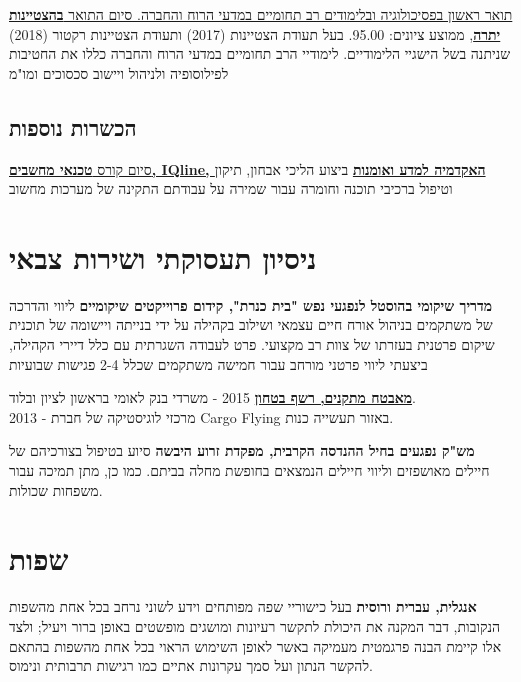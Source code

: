 {\href{https://www.dropbox.com/s/pcm0mybvgi85ma0/BA-Psych.pdf}{תואר ראשון בפסיכולוגיה ובלימודים רב תחומיים במדעי הרוח והחברה. סיום התואר \textbf{בהצטיינות יתרה}}, ממוצע ציונים: 95.00.}
{בעל תעודת הצטיינות (2017) ותעודת הצטיינות רקטור (2018) שניתנה בשל הישגיי הלימודיים.}
{לימודיי הרב תחומיים במדעי הרוח והחברה כללו את החטיבות לפילוסופיה ולניהול ויישוב סכסוכים ומו"מ}

\subsection{הכשרות נוספות}

{\href{https://www.dropbox.com/s/csphxdynjdg3ze2/computer-technitian-certificate.jpg?dl=0}{סיום קורס 
		\textbf{טכנאי מחשבים, IQline, האקדמיה למדע ואומנות}}}
{ביצוע הליכי אבחון, תיקון וטיפול ברכיבי תוכנה וחומרה עבור שמירה על עבודתם התקינה של מערכות מחשוב}
{}

\section{ניסיון תעסוקתי ושירות צבאי}

{\textbf{מדריך שיקומי בהוסטל לנפגעי נפש "בית כנרת", קידום פרוייקטים שיקומיים}}
{ליווי והדרכה של משתקמים בניהול אורח חיים עצמאי ושילוב בקהילה על ידי בנייתה ויישומה של תוכנית שיקום פרטנית בעזרתו של צוות רב מקצועי. פרט לעבודה השגרתית עם כלל דיירי הקהילה, ביצעתי ליווי פרטני מורחב עבור חמישה משתקמים שכלל 2-4 פגישות שבועיות}
{}

{\href{https://www.dropbox.com/s/kr5rcui1zgp35i0/recommendation-letter-security-guard.jpg?dl=0}{\textbf{מאבטח מתקנים, רשף בטחון}}} 
{2015 - משרדי בנק לאומי בראשון לציון ובלוד. 
	\\		
	2013 - מרכזי לוגיסטיקה של חברת Cargo Flying באזור תעשייה כנות.}
{}

{\textbf{מש"ק נפגעים בחיל ההנדסה הקרבית, מפקדת זרוע היבשה}}
{סיוע בטיפול בצורכיהם של חיילים מאושפזים וליווי חיילים הנמצאים בחופשת מחלה בביתם. כמו כן, מתן תמיכה עבור משפחות שכולות.}
{}

\section{שפות}

{\textbf{אנגלית, עברית ורוסית}}
{בעל כישוריי שפה מפותחים וידע לשוני נרחב בכל אחת מהשפות הנקובות, דבר המקנה את היכולת לתקשר רעיונות ומושגים מופשטים באופן ברור ויעיל; ולצד אלו קיימת הבנה פרגמטית מעמיקה באשר לאופן השימוש הראוי בכל אחת מהשפות בהתאם להקשר הנתון ועל סמך עקרונות אתיים כמו רגישות תרבותית ונימוס.} 
{}

